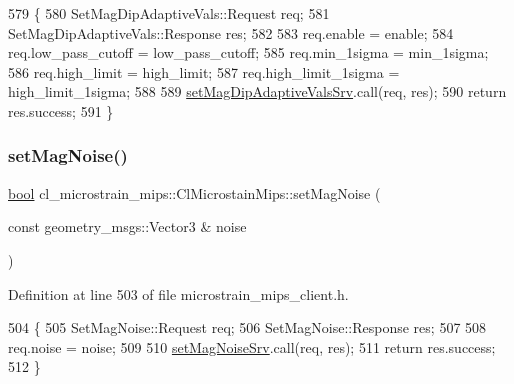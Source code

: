 \begin{DoxyCode}
579     \{
580         SetMagDipAdaptiveVals::Request req;
581         SetMagDipAdaptiveVals::Response res;
582 
583         req.enable = enable;
584         req.low\_pass\_cutoff = low\_pass\_cutoff;
585         req.min\_1sigma = min\_1sigma;
586         req.high\_limit = high\_limit;
587         req.high\_limit\_1sigma = high\_limit\_1sigma;
588 
589         \hyperlink{classcl__microstrain__mips_1_1ClMicrostainMips_a3618b27ce1ed75f2e498c0bc6a36599d}{setMagDipAdaptiveValsSrv}.call(req, res);
590         \textcolor{keywordflow}{return} res.success;
591     \}
\end{DoxyCode}
\mbox{\label{classcl__microstrain__mips_1_1ClMicrostainMips_a6c9825168b47aa42091e410da90f43c8}} 
\subsubsection{\texorpdfstring{set\+Mag\+Noise()}{setMagNoise()}}
{\footnotesize\ttfamily \hyperlink{classbool}{bool} cl\+\_\+microstrain\+\_\+mips\+::\+Cl\+Microstain\+Mips\+::set\+Mag\+Noise (\begin{DoxyParamCaption}\item[{const geometry\+\_\+msgs\+::\+Vector3 \&}]{noise }\end{DoxyParamCaption})\hspace{0.3cm}{\ttfamily [inline]}}



Definition at line 503 of file microstrain\+\_\+mips\+\_\+client.\+h.


\begin{DoxyCode}
504     \{
505         SetMagNoise::Request req;
506         SetMagNoise::Response res;
507 
508         req.noise = noise;
509 
510         \hyperlink{classcl__microstrain__mips_1_1ClMicrostainMips_a0a6ed1132b9cca45536598e78c8b23cc}{setMagNoiseSrv}.call(req, res);
511         \textcolor{keywordflow}{return} res.success;
512     \}
\end{DoxyCode}
\mbox{\label{classcl__microstrain__mips_1_1ClMicrostainMips_a2dae9cbd60e135e149117d6af14e6b27}} 
